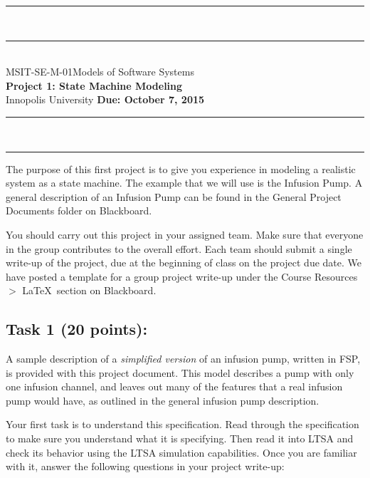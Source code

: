 \documentclass{article}
\newcommand{\head}{\subsection*}
\begin{document}
\begin{center}
\rule{\textwidth}{1.5pt} \\ \rule[10pt]{\textwidth}{1pt}\\
MSIT-SE-M-01\hfill Models of Software Systems\\[3ex]
{\Large\bf Project 1: State Machine Modeling}\\[3ex]
Innopolis University \hfill {\bf Due: October 7, 2015} \rule{\textwidth}{1pt}
\\\rule[9.5pt]{\textwidth}{1.5pt}
\end{center}

The purpose of this first project is to give you experience in
modeling a realistic system as a state machine. The example that we
will use is the Infusion Pump. A general description of an Infusion
Pump can be found in the General Project Documents folder on
Blackboard.

\bigskip You should carry out this project in your assigned team. Make sure that everyone in the group contributes to the overall effort. Each team should submit a single write-up of the project,
due at the beginning of class on the project due date. We have
posted a template for a group project write-up under the Course
Resources $>$ \LaTeX~section on Blackboard.

\head{Task 1 (20 points):}

A sample description of a \emph{simplified version} of an infusion
pump, written in FSP, is provided with this project document. This
model describes a pump with only one infusion channel, and leaves
out many of the features that a real infusion pump would have, as
outlined in the general infusion pump description.

\bigskip Your first task is to understand this specification. Read
through the specification to make sure you understand what it is
specifying. Then read it into LTSA and check its behavior using the
LTSA simulation capabilities. Once you are familiar with it, answer
the following questions in your project write-up:
\end{document}
